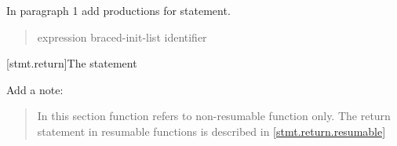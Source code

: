 In paragraph 1 add productions for  statement.

\begin{quote}
\begin{bnf}
	\br
	\br
	\br
	 expression\opt \terminal{;}\br
	 braced-init-list \terminal{;}\br
	\br
	\br
	 identifier \terminal{;}
\end{bnf}
\end{quote}

\setcounter{subsection}{2}
[stmt.return]{The  statement}%
%
%

Add a note:

\begin{quote}
\enternote
In this section function refers to non-resumable function only.
The return statement in resumable functions is described in \ref{stmt.return.resumable}
\exitnote
\end{quote}

